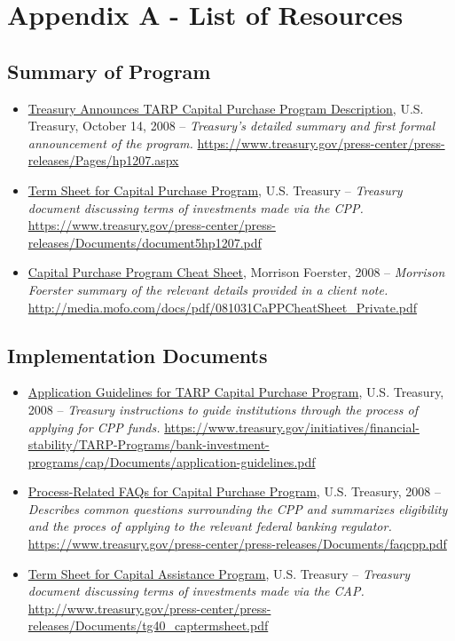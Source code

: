 \documentclass[12pt]{article}
\begin{document}

\nocite{*}


\newpage
\section{Appendix A - List of Resources}

\subsection{Summary of Program}

\begin{itemize}
\item
\ul{Treasury Announces TARP Capital Purchase Program Description}, U.S. Treasury, October 14, 2008 -- \emph{Treasury's detailed summary and first formal announcement of the program.} \url{https://www.treasury.gov/press-center/press-releases/Pages/hp1207.aspx}

\item
\ul{Term
 Sheet for Capital Purchase Program}, U.S. Treasury -- \emph{Treasury
 document discussing terms of investments made via the CPP.} \url{https://www.treasury.gov/press-center/press-releases/Documents/document5hp1207.pdf}

 \item
\ul{Capital Purchase Program Cheat Sheet}, Morrison Foerster, 2008 -- \emph{Morrison Foerster summary of the relevant details provided in a client note.} \url{http://media.mofo.com/docs/pdf/081031CaPPCheatSheet_Private.pdf}
 
 
\end{itemize}

\subsection{Implementation Documents}
\begin{itemize}
\item
\ul{Application Guidelines for TARP Capital Purchase Program},
 U.S. Treasury, 2008 -- \emph{Treasury instructions to guide institutions through the process of applying for CPP funds.} \url{https://www.treasury.gov/initiatives/financial-stability/TARP-Programs/bank-investment-programs/cap/Documents/application-guidelines.pdf}
 \item
\ul{Process-Related FAQs for Capital Purchase Program},
 U.S. Treasury, 2008 -- \emph{Describes common questions surrounding the CPP and summarizes eligibility and the proces of applying to the relevant federal banking regulator.} \url{https://www.treasury.gov/press-center/press-releases/Documents/faqcpp.pdf}
 \item
\ul{Term
 Sheet for Capital Assistance Program}, U.S. Treasury -- \emph{Treasury
 document discussing terms of investments made via the CAP.} \url{http://www.treasury.gov/press-center/press-releases/Documents/tg40_captermsheet.pdf}

\end{itemize}
\end{document}

